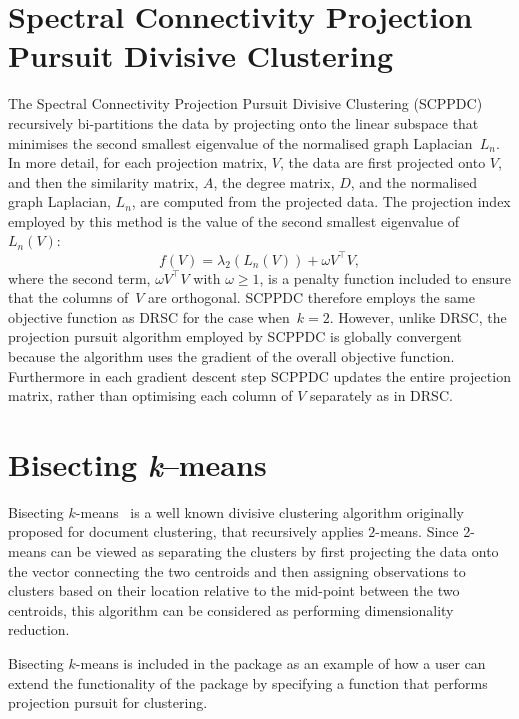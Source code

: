 \documentclass{book}
\begin{document}
\section{Spectral Connectivity Projection Pursuit Divisive Clustering}

The Spectral Connectivity Projection Pursuit Divisive Clustering
(SCPPDC)~\cite{HofmeyrPE2018} recursively bi-partitions the data by projecting
onto the linear subspace that minimises the second smallest eigenvalue of the
normalised graph Laplacian~$L_n$. 
%
In more detail, for each projection matrix, $V$, the data are first projected
onto $V$, and then the similarity matrix, $A$, the degree matrix, $D$, and the normalised graph
Laplacian, $L_n$, are computed from the projected data.
%
The projection index employed by this method is the value of the second
smallest eigenvalue of $L_n(V)$:
%
\[ f(V) = \lambda_2 \left(L_n(V) \right) + \omega V^\top V, \]
%
where the second term, $\omega V^\top V$  with
$\omega \geqslant 1$, is a penalty function included to ensure that the columns
of~$V$ are orthogonal.
%
SCPPDC therefore employs the same objective function as DRSC for the case when~$k=2$.
However, unlike DRSC, the projection pursuit algorithm employed by
SCPPDC is globally convergent because the algorithm uses the gradient of the
overall objective function. Furthermore in each gradient descent step SCPPDC
updates the entire projection matrix, rather than optimising each column of $V$
separately as in DRSC. 


\section{Bisecting {\it k}--means}

Bisecting $k$-means~\cite{SteinbachKK2000} is a well known divisive clustering
algorithm originally proposed for document clustering, that recursively applies
$2$-means. Since 2-means can be viewed as separating the clusters by first
projecting the data onto the vector connecting the two centroids and then
assigning observations to clusters based on their location relative to the
mid-point between the two centroids,
%
%
this algorithm can be considered as performing dimensionality reduction.

Bisecting $k$-means is included in the package as an example of how a user can
extend the functionality of the package by specifying a function that performs
projection pursuit for clustering.
\end{document}
